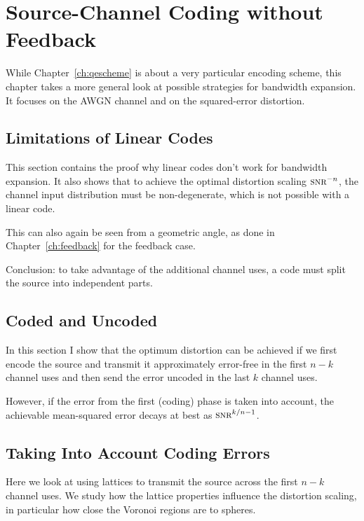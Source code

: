 \chapter{Source-Channel Coding without Feedback}
\label{ch:nofeedback}

While Chapter~\ref{ch:qescheme} is about a very particular encoding scheme, this
chapter takes a more general look at possible strategies for bandwidth
expansion. It focuses on the AWGN channel and on the squared-error distortion. 

\section{Limitations of Linear Codes}

This section contains the proof why linear codes don't work for bandwidth
expansion. It also shows that to achieve the optimal distortion scaling
$\snr^{-n}$, the channel input distribution must be non-degenerate, which is not
possible with a linear code. 

This can also again be seen from a geometric angle, as done in
Chapter~\ref{ch:feedback} for the feedback case.

Conclusion: to take advantage of the additional channel uses, a code must split
the source into independent parts. 


\section{Coded and Uncoded}

In this section I show that the optimum distortion can be achieved if we first
encode the source and transmit it approximately error-free in the first $n-k$
channel uses and then send the error uncoded in the last $k$ channel uses.

However, if the error from the first (coding) phase is taken into account, the
achievable mean-squared error decays at best as $\snr^{k/n-1}$. 


\section{Taking Into Account Coding Errors}

Here we look at using lattices to transmit the source across the first $n-k$
channel uses. We study how the lattice properties influence the distortion
scaling, in particular how close the Voronoi regions are to spheres. 
